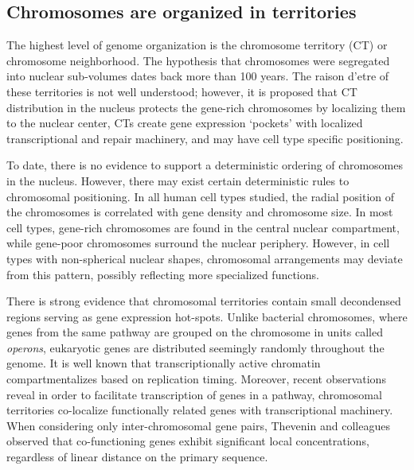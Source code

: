 \subsection{Chromosomes are organized in territories}

The highest level of genome organization is the chromosome territory (CT) or chromosome neighborhood\cite{cremer2001}.
The hypothesis that chromosomes were segregated into nuclear sub-volumes dates back more than 100
years\cite{cremer1993}.  The raison d'etre of these territories is not well understood; however, it is
proposed that CT distribution in the nucleus protects the gene-rich chromosomes by localizing them to
the nuclear center\cite{boyle2001}\cite{federico2006}, CTs create gene expression `pockets' with localized
transcriptional and repair machinery\cite{bolzer2005}, and may have cell type specific positioning.


To date, there is no evidence to support a deterministic ordering of chromosomes in the nucleus.  However,
there may exist certain deterministic rules to chromosomal positioning.  In all human cell types studied,
the radial position of the chromosomes is correlated with gene density and chromosome size\cite{sun2000}\cite{bolzer2005}.
In most cell types, gene-rich chromosomes are found in the central nuclear compartment, while gene-poor
chromosomes surround the nuclear periphery\cite{boyle2001}\cite{kozubek2005}.  However, in cell types with
non-spherical nuclear shapes, chromosomal arrangements may deviate from this pattern, possibly reflecting
more specialized functions\cite{bolzer2005}.

There is strong evidence that chromosomal territories contain small decondensed regions serving as gene
expression hot-spots.  Unlike bacterial chromosomes, where genes from the same pathway are grouped on the
chromosome in units called \textit{operons}, eukaryotic genes are distributed seemingly randomly throughout
the genome\cite{jacob1961}.  It is well known that transcriptionally active chromatin compartmentalizes based
on replication timing\cite{ferreira1997}\cite{sadoni1999}\cite{thevenin2014}.  Moreover, recent observations
reveal in order to facilitate transcription of genes in a pathway, chromosomal territories co-localize
functionally related genes with transcriptional machinery.  When considering only inter-chromosomal gene pairs,
Thevenin and colleagues observed that co-functioning genes exhibit significant local concentrations, regardless
of linear distance on the primary sequence\cite{thevenin2014}.

